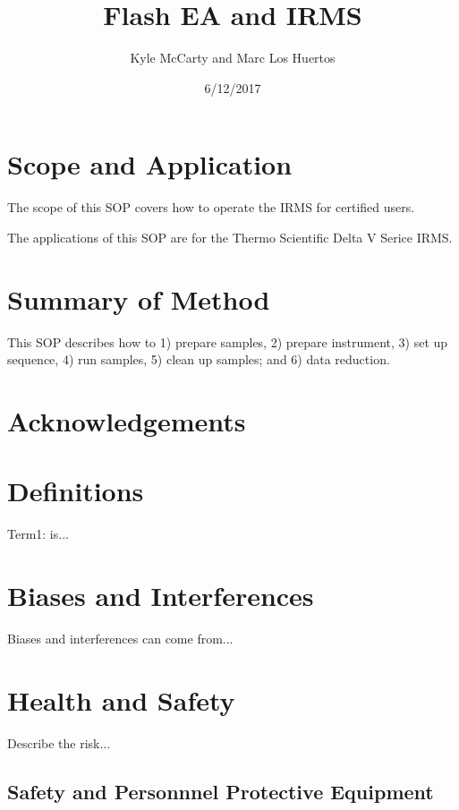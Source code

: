 \documentclass[12pt]{../SOP3_beta}\usepackage[]{graphicx}\usepackage[]{color}
\title{Flash EA and IRMS}
\date{6/12/2017}
\author{Kyle McCarty and Marc Los Huertos}
\begin{document}
\maketitle

\section{Scope and Application}

\NP The scope of this SOP covers how to operate the IRMS for certified users.

\NP The applications of this SOP are for the Thermo Scientific Delta V Serice IRMS. 

\section{Summary of Method}

\NP This SOP describes how to 1) prepare samples, 2) prepare instrument, 3) set up sequence, 4) run samples, 5) clean up samples; and 6) data reduction. 

\tableofcontents

\newpage

\section{Acknowledgements}

\section{Definitions}

\NP Term1: is...

\section{Biases and Interferences}

\NP Biases and interferences can come from...

\section{Health and Safety}

\NP Describe the risk...


\subsection{Safety and Personnnel Protective Equipment}
\end{document}
